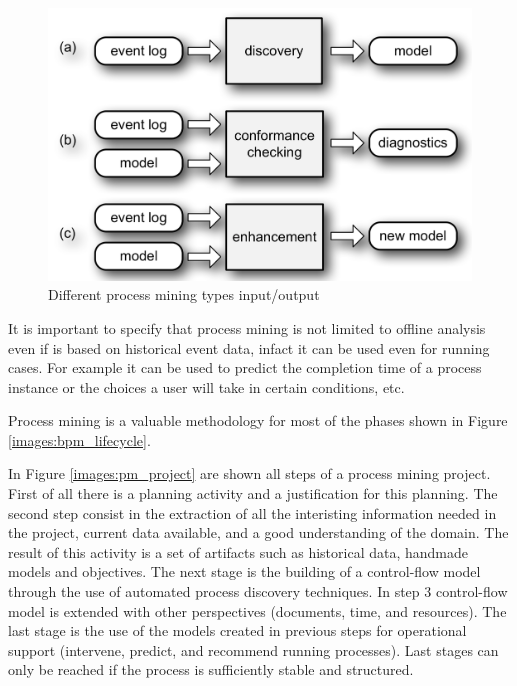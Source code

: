 \begin{figure}[!ht]
    \centering
\includegraphics[width=\textwidth]{images/pm_io.png}
    \caption{Different process mining types input/output \cite{DBLP:conf/bpm/ProcessMiningManifesto}}
    \label{images:pm_io}
\end{figure}

It is important to specify that process mining is not limited to offline analysis even if is based on historical event data, 
infact it can be used even for running cases. For example it can be used to predict the completion time of a process instance 
or the choices a user will take in certain conditions, etc.

Process mining is a valuable methodology for most of the phases shown in Figure \ref{images:bpm_lifecycle}.

In Figure \ref{images:pm_project} are shown all steps of a process mining project.
First of all there is a planning activity and a justification for this planning. The second step consist in the extraction 
of all the interisting information needed in the project, current data available, and a good understanding of the domain. 
The result of this activity is a set of artifacts such as historical data, handmade models and objectives.
The next stage is the building of a control-flow model through the use of automated process discovery techniques.
In step 3 control-flow model is extended with other perspectives (documents, time, and resources). The last stage is the 
use of the models created in previous steps for operational support (intervene, predict, and recommend running processes).
Last stages can only be reached if the process is sufficiently stable and structured.

